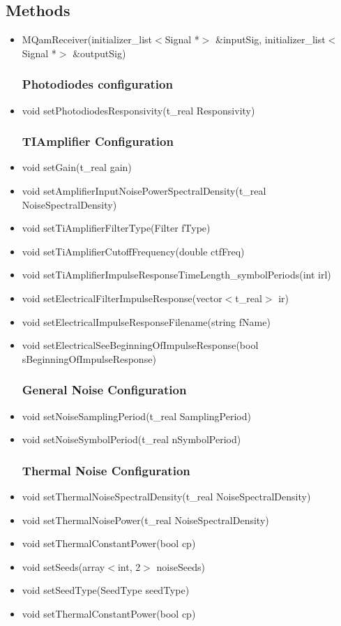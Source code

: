 \subsection{Methods}
        \begin{itemize}
            \item MQamReceiver(initializer\_list$<$Signal *$>$ \&inputSig, initializer\_list$<$Signal *$>$ \&outputSig)
        \subsubsection{Photodiodes configuration}
            \item void setPhotodiodesResponsivity(t\_real Responsivity)
        \subsubsection{TI\textunderscore Amplifier Configuration}
            \item void setGain(t\_real gain)
            \item void setAmplifierInputNoisePowerSpectralDensity(t\_real NoiseSpectralDensity)
            \item void setTiAmplifierFilterType(Filter fType)
            \item void setTiAmplifierCutoffFrequency(double ctfFreq)
            \item void setTiAmplifierImpulseResponseTimeLength\_symbolPeriods(int irl)
            \item void setElectricalFilterImpulseResponse(vector$<$t\_real$>$ ir)
            \item void setElectricalImpulseResponseFilename(string fName)
            \item void setElectricalSeeBeginningOfImpulseResponse\newline (bool sBeginningOfImpulseResponse)
        \subsubsection{General Noise Configuration}
            \item void setNoiseSamplingPeriod(t\_real SamplingPeriod)
            \item void setNoiseSymbolPeriod(t\_real nSymbolPeriod)
        \subsubsection{Thermal Noise Configuration}
            \item void setThermalNoiseSpectralDensity(t\_real NoiseSpectralDensity)
            \item void setThermalNoisePower(t\_real NoiseSpectralDensity)
            \item void setThermalConstantPower(bool cp)
            \item void setSeeds(array$<$int, 2$>$ noiseSeeds)
            \item void setSeedType(SeedType seedType)
            \item void setThermalConstantPower(bool cp)

\end{itemize}
